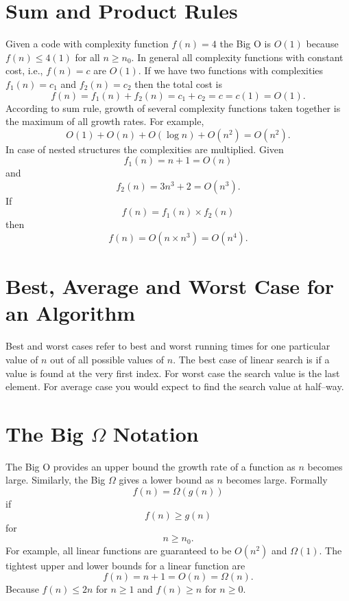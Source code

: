 \documentclass[12pt,a4paper]{article}
\begin{document}
\section{Sum and Product Rules}
Given a code with complexity function $f(n)=4$ the Big O is $O(1)$ because $f(n)\leq4(1)$ for all $n\geq n_0$. In general all complexity functions with constant cost, i.e., $f(n)=c$ are $O(1)$. If we have two functions with complexities $f_1(n)=c_1$ and $f_2(n)=c_2$ then the total cost is
\begin{equation}
f(n)=f_1(n)+f_2(n)=c_1+c_2=c=c(1)=O(1).
\end{equation}
According to sum rule, growth of several complexity functions taken together is the maximum of all growth rates. For example,
\begin{equation}
O(1)+O(n)+O(\log n)+O(n^2)=O(n^2).
\end{equation}
In case of nested structures the complexities are multiplied. Given 
\begin{equation}
f_1(n)=n+1=O(n)
\end{equation}
and
\begin{equation}
f_2(n)=3n^3+2=O(n^3).
\end{equation}
If
\begin{equation}
f(n)=f_1(n)\times f_2(n)
\end{equation}
then 
\begin{equation}
f(n)=O(n\times n^3)=O(n^4).
\end{equation}
\section{Best, Average and Worst Case for an Algorithm}
Best and worst cases refer to best and worst running times for one particular value of $n$ out of all possible values of $n$. The best case of linear search is if a value is found at the very first index. For worst case the search value is the last element. For average case you would expect to find the search value at half--way.
\section{The Big $\Omega$ Notation}
The Big O provides an upper bound the growth rate of a function as $n$ becomes large. Similarly, the Big $\Omega$ gives a lower bound as $n$ becomes large. Formally
\begin{equation}
f(n)=\Omega(g(n))
\end{equation}
if
\begin{equation}
f(n)\geq g(n)
\end{equation}
for
\begin{equation}
n\geq n_0.
\end{equation}
For example, all linear functions are guaranteed to be $O(n^2)$ and $\Omega(1)$. The tightest upper and lower bounds for a linear function are 
\begin{equation}
f(n)=n+1=O(n)=\Omega(n).
\end{equation}
Because $f(n)\leq 2n$ for $n\geq1$ and $f(n)\geq n$ for $n\geq 0$.
\end{document}

